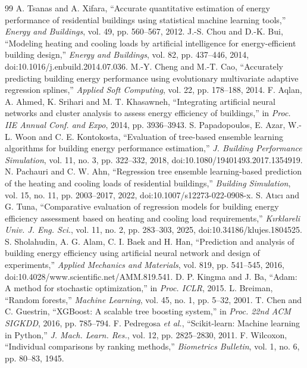 \documentclass[conference]{IEEEtran}
\begin{document}
\begin{thebibliography}{99}
 A. Tsanas and A. Xifara, ``Accurate quantitative estimation of energy performance of residential buildings using statistical machine learning tools,'' \emph{Energy and Buildings}, vol. 49, pp. 560--567, 2012.
 J.-S. Chou and D.-K. Bui, ``Modeling heating and cooling loads by artificial intelligence for energy-efficient building design,'' \emph{Energy and Buildings}, vol. 82, pp. 437--446, 2014, doi:10.1016/j.enbuild.2014.07.036.
 M.-Y. Cheng and M.-T. Cao, ``Accurately predicting building energy performance using evolutionary multivariate adaptive regression splines,'' \emph{Applied Soft Computing}, vol. 22, pp. 178--188, 2014.
 F. Aqlan, A. Ahmed, K. Srihari and M. T. Khasawneh, ``Integrating artificial neural networks and cluster analysis to assess energy efficiency of buildings,'' in \emph{Proc. IIE Annual Conf. and Expo}, 2014, pp. 3936--3943.
 S. Papadopoulos, E. Azar, W.-L. Woon and C. E. Kontokosta, ``Evaluation of tree-based ensemble learning algorithms for building energy performance estimation,'' \emph{J. Building Performance Simulation}, vol. 11, no. 3, pp. 322--332, 2018, doi:10.1080/19401493.2017.1354919.
 N. Pachauri and C. W. Ahn, ``Regression tree ensemble learning-based prediction of the heating and cooling loads of residential buildings,'' \emph{Building Simulation}, vol. 15, no. 11, pp. 2003--2017, 2022, doi:10.1007/s12273-022-0908-x.
 S. Atıcı and G. Tuna, ``Comparative evaluation of regression models for building energy efficiency assessment based on heating and cooling load requirements,'' \emph{Kırklareli Univ. J. Eng. Sci.}, vol. 11, no. 2, pp. 283--303, 2025, doi:10.34186/klujes.1804525.
 S. Sholahudin, A. G. Alam, C. I. Baek and H. Han, ``Prediction and analysis of building energy efficiency using artificial neural network and design of experiments,'' \emph{Applied Mechanics and Materials}, vol. 819, pp. 541--545, 2016, doi:10.4028/www.scientific.net/AMM.819.541.
 D. P. Kingma and J. Ba, ``Adam: A method for stochastic optimization,'' in \emph{Proc. ICLR}, 2015.
 L. Breiman, ``Random forests,'' \emph{Machine Learning}, vol. 45, no. 1, pp. 5--32, 2001.
 T. Chen and C. Guestrin, ``XGBoost: A scalable tree boosting system,'' in \emph{Proc. 22nd ACM SIGKDD}, 2016, pp. 785--794.
 F. Pedregosa \emph{et al.}, ``Scikit-learn: Machine learning in Python,'' \emph{J. Mach. Learn. Res.}, vol. 12, pp. 2825--2830, 2011.
 F. Wilcoxon, ``Individual comparisons by ranking methods,'' \emph{Biometrics Bulletin}, vol. 1, no. 6, pp. 80--83, 1945.
\end{thebibliography}
\end{document}
